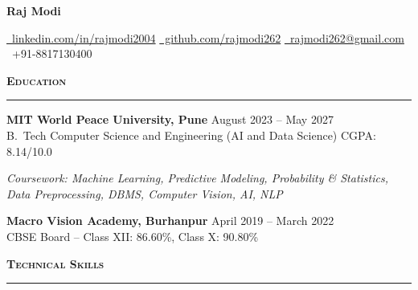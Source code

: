 \documentclass[a4paper,10pt]{article}
\newcommand{\sectionHeader}[2]{%
  \vspace{5pt}%
  \noindent%
  {\normalsize\bfseries\color{HeaderDark}#2\enspace\textsc{#1}}%
  \\[-6pt]%
  {\color{SectionLine}\rule{\textwidth}{1pt}}%
  \vspace{1pt}\par%
}
\newcommand{\eduEntry}[4]{%
  \vspace{1pt}%
  \noindent\textbf{\color{HeaderDark}#1} \hfill {\small\color{SubText}#2}\\[-3pt]%
  {\small\color{MidGray}#3} \hfill {\small\color{SubText}#4}%
  \vspace{0pt}\par%
}
\begin{document}

\begin{center}
  {\fontsize{24}{28}\selectfont\bfseries\color{HeaderDark}Raj Modi}

  \vspace{3pt}

  {\small%
    \href{https://www.linkedin.com/in/rajmodi2004/}{{\color{AccentBlue}\faLinkedin}~\color{LinkBlue}linkedin.com/in/rajmodi2004}%
    \quad{\color{LightGray}|}%
    \quad\href{https://github.com/rajmodi262}{{\color{AccentBlue}\faGithub}~\color{LinkBlue}github.com/rajmodi262}%
    \quad{\color{LightGray}|}%
    \quad\href{mailto:rajmodi262@gmail.com}{{\color{AccentBlue}\faEnvelope}~\color{LinkBlue}rajmodi262@gmail.com}%
    \quad{\color{LightGray}|}%
    \quad{\color{AccentBlue}\faPhone*}~{\color{DarkGray}+91-8817130400}%
  }
\end{center}

\vspace{-4pt}


\sectionHeader{Education}{\faGraduationCap}

\eduEntry{MIT World Peace University, Pune}
  {August 2023 -- May 2027}
  {B.\ Tech Computer Science and Engineering (AI and Data Science)}
  {CGPA: 8.14/10.0}

\vspace{1pt}
{\footnotesize\color{SubText}\textit{Coursework: Machine Learning, Predictive Modeling, Probability \& Statistics, Data Preprocessing, DBMS, Computer Vision, AI, NLP}\par}

\eduEntry{Macro Vision Academy, Burhanpur}
  {April 2019 -- March 2022}
  {CBSE Board -- Class XII: 86.60\%, Class X: 90.80\%}
  {}


\sectionHeader{Technical Skills}{\faCogs}
\end{document}
